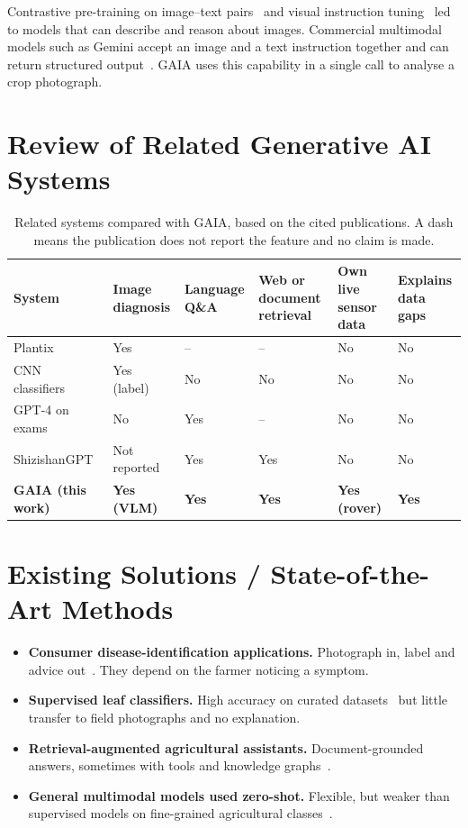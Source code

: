Contrastive pre-training on image--text pairs~\cite{radford2021clip} and visual instruction tuning~\cite{liu2023llava} led to
models that can describe and reason about images. Commercial multimodal models such as Gemini accept an image and a
text instruction together and can return structured output~\cite{gemini2023,gemini25,geminiapi}. GAIA uses this
capability in a single call to analyse a crop photograph.

\section{Review of Related Generative AI Systems}

\begin{table}[H]
\centering
\caption{Related systems compared with GAIA, based on the cited publications. A dash means the publication does not report the feature and no claim is made.}
\label{tab:related}
\small
\begin{tabular}{|P{3.1cm}|P{1.7cm}|P{1.7cm}|P{1.8cm}|P{2.0cm}|P{1.9cm}|}
\hline
\textbf{System} & \textbf{Image diagnosis} & \textbf{Language Q\&A} & \textbf{Web or document retrieval} & \textbf{Own live sensor data} & \textbf{Explains data gaps}\\\hline
Plantix~\cite{plantix} & Yes & -- & -- & No & No\\\hline
CNN classifiers~\cite{mohanty2016plantvillage,ferentinos2018deep} & Yes (label) & No & No & No & No\\\hline
GPT-4 on exams~\cite{silva2023gpt4agronomist} & No & Yes & -- & No & No\\\hline
ShizishanGPT~\cite{yang2024shizishangpt} & Not reported & Yes & Yes & No & No\\\hline
\textbf{GAIA (this work)} & \textbf{Yes (VLM)} & \textbf{Yes} & \textbf{Yes} & \textbf{Yes (rover)} & \textbf{Yes}\\\hline
\end{tabular}
\end{table}

\section{Existing Solutions / State-of-the-Art Methods}

\begin{itemize}
\item \textbf{Consumer disease-identification applications.} Photograph in, label and advice out~\cite{plantix}. They depend
      on the farmer noticing a symptom.
\item \textbf{Supervised leaf classifiers.} High accuracy on curated datasets~\cite{mohanty2016plantvillage,ferentinos2018deep}
      but little transfer to field photographs and no explanation.
\item \textbf{Retrieval-augmented agricultural assistants.} Document-grounded answers, sometimes with tools and
      knowledge graphs~\cite{balaguer2024ragvsft,yang2024shizishangpt}.
\item \textbf{General multimodal models used zero-shot.} Flexible, but weaker than supervised models on fine-grained
      agricultural classes~\cite{ranario2025vlmag,nguyen2026leafnet}.
\end{itemize}

